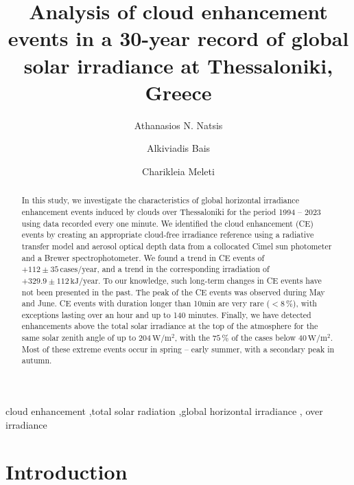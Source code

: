 \documentclass[preprint, 5p,
authoryear]{elsarticle} %
\begin{document}
\begin{frontmatter}

  \title{Analysis of cloud enhancement events in a 30-year record of
global solar irradiance at Thessaloniki, Greece}
    \author[LAP]{Athanasios N. Natsis%
  }
    \author[LAP]{Alkiviadis Bais%
  }
    \author[LAP]{Charikleia Meleti%
  }
  
  \begin{abstract}
  In this study, we investigate the characteristics of global horizontal
  irradiance enhancement events induced by clouds over Thessaloniki for
  the period 1994 -- 2023 using data recorded every one minute. We
  identified the cloud enhancement (CE) events by creating an
  appropriate cloud-free irradiance reference using a radiative transfer
  model and aerosol optical depth data from a collocated Cimel sun
  photometer and a Brewer spectrophotometer. We found a trend in CE
  events of \(+112\pm 35\,\text{cases}/\text{year}\), and a trend in the
  corresponding irradiation of \(+329.9\pm 112\,\text{kJ}/\text{year}\).
  To our knowledge, such long-term changes in CE events have not been
  presented in the past. The peak of the CE events was observed during
  May and June. CE events with duration longer than 10\nobreakspace{}min
  are very rare (\(<8\,\%\)), with exceptions lasting over an hour and
  up to 140 minutes. Finally, we have detected enhancements above the
  total solar irradiance at the top of the atmosphere for the same solar
  zenith angle of up to \(204\,\text{W}/\text{m}^{2}\), with the
  \(75\,\%\) of the cases below \(40\,\text{W}/\text{m}^{2}\). Most of
  these extreme events occur in spring -- early summer, with a secondary
  peak in autumn.
  \end{abstract}
    \begin{keyword}
    cloud enhancement \sep total solar radiation \sep global horizontal
irradiance \sep 
    over irradiance
  \end{keyword}
  
 \end{frontmatter}

\hypertarget{introduction}{%
\section{Introduction}\label{introduction}}
\end{document}
